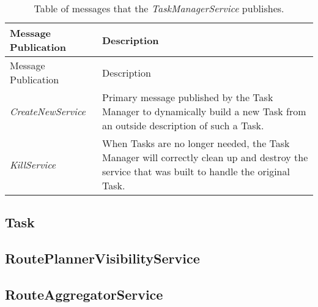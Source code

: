 \begin{longtable}[c]{@{}ll@{}}
\caption{Table of messages that the \emph{TaskManagerService}
publishes.}\tabularnewline
\toprule
\begin{minipage}[b]{0.29\columnwidth}\raggedright\strut
Message Publication
\strut\end{minipage} &
\begin{minipage}[b]{0.65\columnwidth}\raggedright\strut
Description
\strut\end{minipage}\tabularnewline
\midrule
\endfirsthead
\toprule
\begin{minipage}[b]{0.29\columnwidth}\raggedright\strut
Message Publication
\strut\end{minipage} &
\begin{minipage}[b]{0.65\columnwidth}\raggedright\strut
Description
\strut\end{minipage}\tabularnewline
\midrule
\endhead
\begin{minipage}[t]{0.29\columnwidth}\raggedright\strut
\emph{CreateNewService}
\strut\end{minipage} &
\begin{minipage}[t]{0.65\columnwidth}\raggedright\strut
Primary message published by the Task Manager to dynamically build a new
Task from an outside description of such a Task.
\strut\end{minipage}\tabularnewline
\begin{minipage}[t]{0.29\columnwidth}\raggedright\strut
\emph{KillService}
\strut\end{minipage} &
\begin{minipage}[t]{0.65\columnwidth}\raggedright\strut
When Tasks are no longer needed, the Task Manager will correctly clean
up and destroy the service that was built to handle the original Task.
\strut\end{minipage}\tabularnewline
\bottomrule
\end{longtable}

\subsection{Task}\label{task}

\subsection{RoutePlannerVisibilityService}\label{routeplannervisibilityservice}

\subsection{RouteAggregatorService}\label{routeaggregatorservice}


